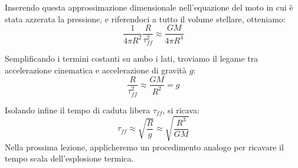 Inserendo questa approssimazione dimensionale nell'equazione del moto in cui è stata azzerata la pressione, e riferendoci a tutto il volume stellare, otteniamo:
\begin{equation}
\frac{1}{4\pi R^2} \frac{R}{\tau_{ff}^2} \approx \frac{G M}{4\pi R^4}
\end{equation}

Semplificando i termini costanti su ambo i lati, troviamo il legame tra accelerazione cinematica e accelerazione di gravità $g$:
\begin{equation}
\frac{R}{\tau_{ff}^2} \approx \frac{G M}{R^2} = g
\end{equation}

Isolando infine il tempo di caduta libera $\tau_{ff}$, si ricava:
\begin{equation}
\tau_{ff} \approx \sqrt{\frac{R}{g}} \approx \sqrt{\frac{R^3}{G M}}
\end{equation}
Nella prossima lezione, applicheremo un procedimento analogo per ricavare il tempo scala dell'esplosione termica.
